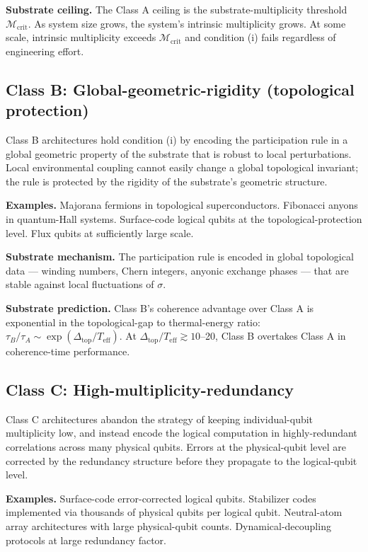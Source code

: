 \documentclass[11pt,a4paper]{article}
\begin{document}
\textbf{Substrate ceiling.} The Class A ceiling is the substrate-multiplicity threshold $\mathcal{M}_{\mathrm{crit}}$. As system size grows, the system's intrinsic multiplicity grows. At some scale, intrinsic multiplicity exceeds $\mathcal{M}_{\mathrm{crit}}$ and condition (i) fails regardless of engineering effort.

\subsection{Class B: Global-geometric-rigidity (topological protection)}

Class B architectures hold condition (i) by encoding the participation rule in a global geometric property of the substrate that is robust to local perturbations. Local environmental coupling cannot easily change a global topological invariant; the rule is protected by the rigidity of the substrate's geometric structure.

\textbf{Examples.} Majorana fermions in topological superconductors. Fibonacci anyons in quantum-Hall systems. Surface-code logical qubits at the topological-protection level. Flux qubits at sufficiently large scale.

\textbf{Substrate mechanism.} The participation rule is encoded in global topological data --- winding numbers, Chern integers, anyonic exchange phases --- that are stable against local fluctuations of $\sigma$.

\textbf{Substrate prediction.} Class B's coherence advantage over Class A is exponential in the topological-gap to thermal-energy ratio: $\tau_B/\tau_A \sim \exp(\Delta_{\mathrm{top}}/T_{\mathrm{eff}})$. At $\Delta_{\mathrm{top}}/T_{\mathrm{eff}} \gtrsim 10$--20, Class B overtakes Class A in coherence-time performance.

\subsection{Class C: High-multiplicity-redundancy}

Class C architectures abandon the strategy of keeping individual-qubit multiplicity low, and instead encode the logical computation in highly-redundant correlations across many physical qubits. Errors at the physical-qubit level are corrected by the redundancy structure before they propagate to the logical-qubit level.

\textbf{Examples.} Surface-code error-corrected logical qubits. Stabilizer codes implemented via thousands of physical qubits per logical qubit. Neutral-atom array architectures with large physical-qubit counts. Dynamical-decoupling protocols at large redundancy factor.
\end{document}
